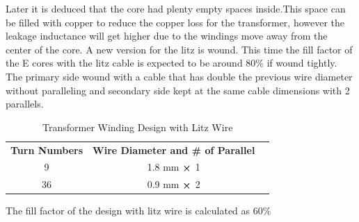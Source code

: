 \documentclass[12pt]{article}
\begin{document}
    Later it is deduced that the core had plenty empty spaces inside.This space can be filled with copper to reduce the copper loss for the transformer, however the leakage inductance will get higher due to the windings move away from the center of the core. A new version for the litz is wound. This time the fill factor of the E cores with the litz cable is expected to be around 80\% if wound tightly. The primary side wound with a cable that has double the previous wire diameter without paralleling and secondary side kept at the same cable dimensions with 2 parallels.


    \begin{table}[H]
        \centering
        \begin{tabular}{|c|c|l}
        \cline{1-2}
        \textbf{Turn Numbers} & \textbf{Wire Diameter and \# of Parallel} &  \\ \cline{1-2}
        9                         & 1.8 mm $\cross$ 1                                &  \\ \cline{1-2}
        36                         & 0.9 mm $\cross$ 2                                  &  \\ \cline{1-2}
        \end{tabular}
        \caption{Transformer Winding Design with Litz Wire}
        \label{tab:DCM}
    \end{table}

    The fill factor of the design with litz wire is calculated as $60\%$
\end{document}
